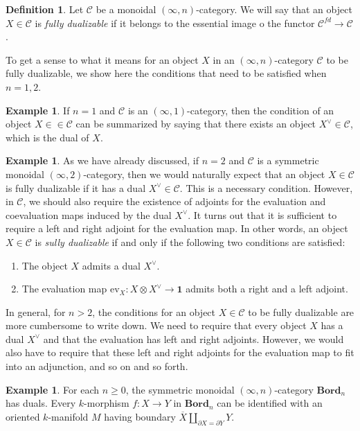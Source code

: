\documentclass[a4paper,11pt]{article}
\newcommand{\ccal}{\mathcal{C}}
\theoremstyle{plain}
\theoremstyle{definition}
\newtheorem{defi}[thm]{Definition}
\newtheorem{ej}[thm]{Example}
\theoremstyle{remark}
\begin{document}
\begin{defi}
Let $\ccal$ be a monoidal $(\infty, n)$-category. We will say that an object $X \in \ccal$ is \textit{fully dualizable} if it belongs to the essential image o the functor $\ccal^{fd} \to \ccal$. 
\end{defi}

To get a sense to what it means for an object $X$ in an $(\infty, n)$-category $\ccal$ to be fully dualizable, we show here the conditions that need to be satisfied when $n = 1, 2$.


\begin{ej}
If $n = 1$ and $\ccal$ is an $(\infty, 1)$-category, then the condition of an object $X \in \in \ccal$ can be summarized by saying that there exists an object $X^{\lor} \in \ccal$, which is the dual of $X$. 
\end{ej}

\begin{ej}
As we have already discussed, if $n = 2$ and $\ccal$ is a symmetric monoidal $(\infty, 2)$-category, then we would naturally expect that an object $X \in \ccal$ is fully dualizable if it has a dual $X^{\lor} \in \ccal$. This is a necessary condition. However, in $\ccal$, we should also require the existence of adjoints for the evaluation and coevaluation maps induced by the dual $X^{\lor}$. It turns out that it is sufficient to require a left and right adjoint for the evaluation map. In other words, an object $X \in \ccal$ is \textit{sully dualizable} if and only if the following two conditions are satisfied: 
\begin{enumerate}[label = \arabic*)]
    \item The object $X$ admits a dual $X^{\lor}$.
    \item The evaluation map $\text{ev}_X \colon X \otimes X^{\lor} \to \mathbf{1}$ admits both a right and a left adjoint. 
\end{enumerate}
\end{ej}

In general, for $n >2$, the conditions for an object $X \in \ccal$ to be fully dualizable are more cumbersome to write down. We need to require that every object $X$ has a dual $X^{\lor}$ and that the evaluation has left and right adjoints. However, we would also have to require that these left and right adjoints for the evaluation map to fit into an adjunction, and so on and so forth. 


\begin{ej}
\label{bordism_duals}
For each $n \geq 0$, the symmetric monoidal $(\infty, n)$-category $\textbf{Bord}_n$ has duals. Every $k$-morphism $f \colon X \to Y$ in $\textbf{Bord}_n$ can be identified with an oriented $k$-manifold $M$ having boundary $\overline{X} \amalg_{\partial X = \partial Y} Y$.
\end{ej}
\end{document}
